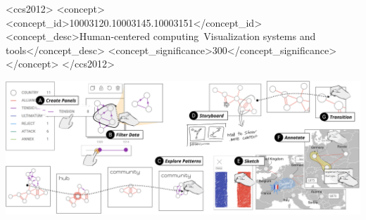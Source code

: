 \documentclass[sigchi]{acmart}
\newcommand{\toolname}{DataToon}
\begin{document}
\begin{CCSXML}
<ccs2012>
<concept>
<concept_id>10003120.10003145.10003151</concept_id>
<concept_desc>Human-centered computing~Visualization systems and tools</concept_desc>
<concept_significance>300</concept_significance>
</concept>
</ccs2012>
\end{CCSXML}



\begin{teaserfigure}
  \includegraphics[width=1.0\textwidth]{figures/teaser.png}
  \caption{\toolname{} is a pen \& touch environment for producing data comics. A storyteller can rapidly isolate aspects of their data via filtering and pattern detection, as well as assemble a rich narrative via annotation and automatic panel transitions.}
  \centering
  \label{fig:teaser}
\end{teaserfigure} 

\maketitle
\renewcommand{\shortauthors}{Nam et al.}
% 



% 
%
% 
% 
% 
% 
% 
% 



\end{document}
